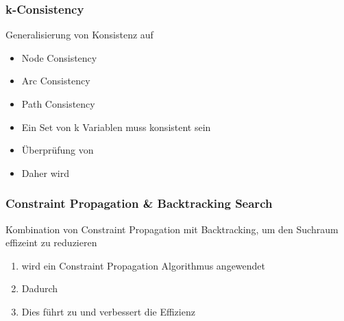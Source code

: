 \subsubsection*{k-Consistency}
Generalisierung von Konsistenz auf 
\begin{itemize}
    \item {} Node Consistency
    \item {} Arc Consistency
    \item {} Path Consistency
    \item {} Ein Set von k Variablen muss konsistent sein
\end{itemize}
\begin{itemize}
    \item Überprüfung von 
    \item Daher wird 
\end{itemize}
\subsubsection*{Constraint Propagation \& Backtracking Search}
 Kombination von Constraint Propagation mit Backtracking, um den Suchraum effizeint zu reduzieren\\
\begin{enumerate}
    \item {} wird ein Constraint Propagation Algorithmus angewendet
    \item Dadurch 
    \item Dies führt zu  und verbessert die Effizienz
\end{enumerate}

